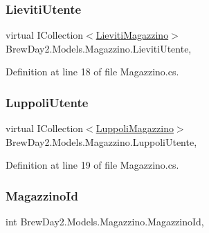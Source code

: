 \subsubsection{\texorpdfstring{Lieviti\+Utente}{LievitiUtente}}
{\footnotesize\ttfamily virtual I\+Collection$<$\mbox{\hyperlink{class_brew_day2_1_1_models_1_1_lieviti_magazzino}{Lieviti\+Magazzino}}$>$ Brew\+Day2.\+Models.\+Magazzino.\+Lieviti\+Utente\hspace{0.3cm}{\ttfamily [get]}, {\ttfamily [set]}}



Definition at line 18 of file Magazzino.\+cs.

\mbox{\label{class_brew_day2_1_1_models_1_1_magazzino_a643073b37dbc320594c9e927abbba0b4}} 
\subsubsection{\texorpdfstring{Luppoli\+Utente}{LuppoliUtente}}
{\footnotesize\ttfamily virtual I\+Collection$<$\mbox{\hyperlink{class_brew_day2_1_1_models_1_1_luppoli_magazzino}{Luppoli\+Magazzino}}$>$ Brew\+Day2.\+Models.\+Magazzino.\+Luppoli\+Utente\hspace{0.3cm}{\ttfamily [get]}, {\ttfamily [set]}}



Definition at line 19 of file Magazzino.\+cs.

\mbox{\label{class_brew_day2_1_1_models_1_1_magazzino_a1f1b2a8b6de28e4985f55c947437c84f}} 
\subsubsection{\texorpdfstring{Magazzino\+Id}{MagazzinoId}}
{\footnotesize\ttfamily int Brew\+Day2.\+Models.\+Magazzino.\+Magazzino\+Id\hspace{0.3cm}{\ttfamily [get]}, {\ttfamily [set]}}



